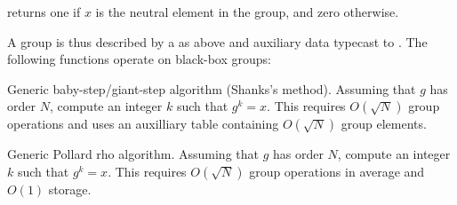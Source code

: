  returns one if $x$ is the neutral element in the group,
and zero otherwise.

A group is thus described by a  as above and auxiliary
data typecast to . The following functions operate on black-box
groups:

 Generic baby-step/giant-step algorithm
(Shanks's method). Assuming that $g$ has order $N$, compute an integer $k$
such that $g^k = x$. This requires $O(\sqrt{N})$ group operations and uses an
auxilliary table containing $O(\sqrt{N})$ group elements.

 Generic Pollard rho algorithm. Assuming that $g$ has order $N$, compute an integer $k$
such that $g^k = x$. This requires $O(\sqrt{N})$ group operations in average
and $O(1)$ storage.

